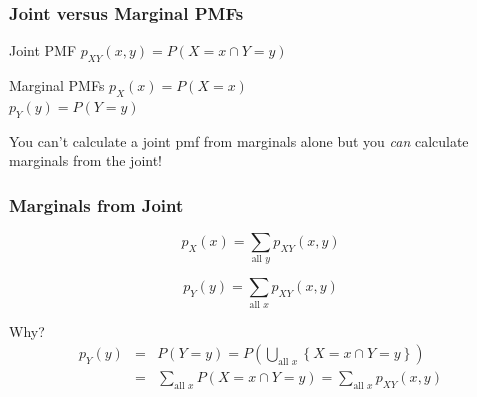 \documentclass[handout]{beamer}
\begin{document}
\begin{frame}
\frametitle{Joint versus Marginal PMFs}

\begin{block}{Joint PMF}
 $p_{XY}(x,y) = P(X=x \cap Y=y)$
\end{block}



\begin{block}{Marginal PMFs}
$p_X(x) = P(X=x)$\\ $p_Y(y) = P(Y=y)$
\end{block}



\vspace{1em}

\alert{You can't calculate a joint pmf from marginals alone but you \emph{can} calculate marginals from the joint!}

\end{frame}
\begin{frame}
\frametitle{Marginals from Joint}

	$$\boxed{p_X(x) = \sum_{\mbox{all } y} p_{XY}(x,y)}$$
	
	$$\boxed{p_Y(y) = \sum_{\mbox{all } x} p_{XY}(x,y)}$$


\begin{block}{Why?}
	\begin{eqnarray*}
	p_Y(y) &=& P(Y=y) = P\left( \bigcup_{\mbox{all } x}\left\{ X=x \cap Y=y \right\}  \right)\\
		&=& \sum_{\mbox{all } x} P(X=x \cap Y=y) = \sum_{\mbox{all } x} p_{XY}(x,y)
	\end{eqnarray*}
\end{block}
\end{frame}
\end{document}
